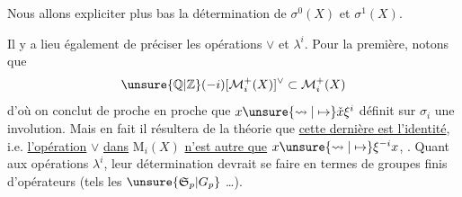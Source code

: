 Nous allons expliciter plus bas la détermination
de $\sigma^0(X)$ et $\sigma^1(X)$.

Il y a lieu également de préciser
les opérations $\vee$ et $\lambda^i$. Pour la
première, notons que
\[
\unsure{\mathbb{Q}|\mathbb{Z}}(-i)[\mathcal{M}_i^+(X)]^\vee\subset \mathcal{M}_i^+(X)
\]
d'où on conclut de proche en
proche que $x\unsure{\rightsquigarrow|\mapsto} \check x\xi^i$ définit sur
$\sigma_i$ une involution. Mais en fait il
résultera de la théorie  que
\uline{cette dernière est l'identité}, i.e.
\uline{l'opération} $\vee$ \uline{dans} 
$\mathrm{M}_i(X)$  \uline{n'est
autre que} $x\unsure{\rightsquigarrow|\mapsto}\xi^{-i}x$,
.
Quant aux opérations $\lambda^i$, leur détermination
devrait se faire en termes de groupes finis
d'opérateurs (tels les $\unsure{\mathfrak{S}_p|G_p}$ \ldots).
